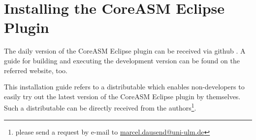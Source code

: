 \documentclass[10pt,oneside,a4paper]{article}
\begin{document}
\newpage
\tableofcontents
\newpage


\section{Installing the CoreASM Eclipse Plugin}
The daily version of the CoreASM Eclipse plugin can be received via github \cite{Dausend.Farahbod.ea2012}. A guide for building and executing the development version can be found on the referred website, too.

This installation guide refers to a  distributable which enables non-developers to easily try out the latest version of the CoreASM Eclipse plugin by themselves. Such a distributable can be directly received from the authors\footnote{please send a request by e-mail to \url{marcel.dausend@uni-ulm.de}}.
\end{document}
